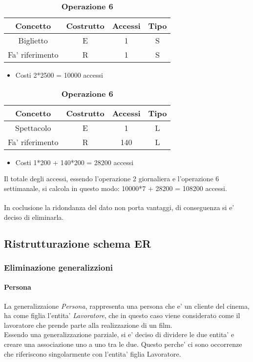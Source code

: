 \documentclass[10pt]{article}
\begin{document}
	\begin{table}[!h]
		\centering
		\caption{\textbf{Operazione 2}} \label{tab:sometab}
		\begin{tabular}{|c|c|c|c|}
			\hline
			\textbf{Concetto} & \textbf{Costrutto} & \textbf{Accessi} & \textbf{Tipo} \\
			\hline
			Biglietto & E & 1 & S \\
			\hline
			Fa' riferimento & R & 1 & S \\
			\hline
		\end{tabular}
		\begin{itemize}
			\item Costi 2*2500 = 10000 accessi 
		\end{itemize}
		\caption{\textbf{Operazione 6}} \label{tab:sometab}
		\begin{tabular}{|c|c|c|c|}
			\hline
			\textbf{Concetto} & \textbf{Costrutto} & \textbf{Accessi} & \textbf{Tipo} \\
			\hline
			Spettacolo & E & 1 & L \\
			\hline
			Fa' riferimento & R &140&L\\
			\hline
		\end{tabular}
		\begin{itemize}
			\item Costi 1*200 + 140*200 = 28200 accessi
		\end{itemize}
	\end{table}
	Il totale degli accessi, essendo l'operazione 2 giornaliera e l'operazione 6 settimanale, si calcola in questo modo: 10000*7 + 28200 = 108200 accessi.\\\\
	In coclusione la ridondanza del dato non porta vantaggi, di conseguenza si e' deciso di eliminarla.
	\subsection{Ristrutturazione schema ER}
	\subsubsection{Eliminazione generalizzioni}
	\paragraph{Persona}
	La generalizzaione \textit{Persona}, rappresenta una persona che e' un cliente del cinema, ha come figlia l'entita' \textit{Lavoratore}, che in questo caso viene considerato come il lavoratore che prende parte alla realizzazione di un film.\\
	Essendo una generalizzazione parziale, si e' deciso di dividere le due entita' e creare una associazione uno a uno tra le due. Questo perche' ci sono occorrenze che riferiscono singolarmente con l'entita' figlia Lavoratore.\\
\end{document}
